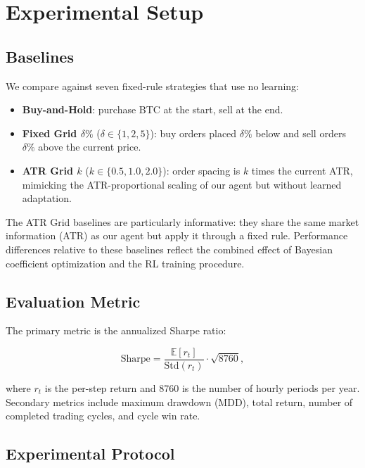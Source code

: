 \documentclass[11pt, a4paper]{article}
\begin{document}
\section{Experimental Setup}

\subsection{Baselines}

We compare against seven fixed-rule strategies that use no learning:

\begin{itemize}
    \item \textbf{Buy-and-Hold}: purchase BTC at the start, sell at the end.
    \item \textbf{Fixed Grid $\delta\%$} ($\delta \in \{1, 2, 5\}$): buy orders placed
          $\delta\%$ below and sell orders $\delta\%$ above the current price.
    \item \textbf{ATR Grid $k$} ($k \in \{0.5, 1.0, 2.0\}$): order spacing is $k$ times
          the current ATR, mimicking the ATR-proportional scaling of our agent but
          without learned adaptation.
\end{itemize}

The ATR Grid baselines are particularly informative: they share the same market
information (ATR) as our agent but apply it through a fixed rule.
Performance differences relative to these baselines reflect the combined effect of
Bayesian coefficient optimization and the RL training procedure.

\subsection{Evaluation Metric}

The primary metric is the annualized Sharpe ratio:

\begin{equation}
    \text{Sharpe} = \frac{\mathbb{E}[r_t]}{\text{Std}(r_t)} \cdot \sqrt{8760},
    \label{eq:sharpe}
\end{equation}

where $r_t$ is the per-step return and 8760 is the number of hourly periods per
year.
Secondary metrics include maximum drawdown (MDD), total return, number of
completed trading cycles, and cycle win rate.

\subsection{Experimental Protocol}
\end{document}
